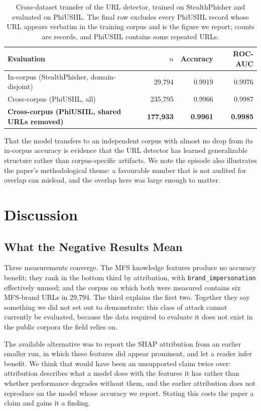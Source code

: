 \documentclass[manuscript,screen,review]{acmart}
\begin{document}
\begin{table}[t]
\centering
\caption{Cross-dataset transfer of the URL detector, trained on StealthPhisher and evaluated on PhiUSIIL. The final row excludes every PhiUSIIL record whose URL appears verbatim in the training corpus and is the figure we report; counts are records, and PhiUSIIL contains some repeated URLs.}
\label{tab:transfer}
\small
\begin{tabular}{lrrr}
\toprule
Evaluation & $n$ & Accuracy & ROC-AUC \\
\midrule
In-corpus (StealthPhisher, domain-disjoint) & 29{,}794 & 0.9919 & 0.9976 \\
Cross-corpus (PhiUSIIL, all) & 235{,}795 & 0.9966 & 0.9987 \\
\textbf{Cross-corpus (PhiUSIIL, shared URLs removed)} & \textbf{177{,}933} & \textbf{0.9961} & \textbf{0.9985} \\
\bottomrule
\end{tabular}
\end{table}

That the model transfers to an independent corpus with almost no drop from its in-corpus accuracy is evidence that the URL detector has learned generalizable structure rather than corpus-specific artifacts. We note the episode also illustrates the paper's methodological theme: a favourable number that is not audited for overlap can mislead, and the overlap here was large enough to matter.

\section{Discussion}
\subsection{What the Negative Results Mean}
Three measurements converge. The MFS knowledge features produce no accuracy benefit; they rank in the bottom third by attribution, with \texttt{brand\_impersonation} effectively unused; and the corpus on which both were measured contains six MFS-brand URLs in 29{,}794. The third explains the first two. Together they say something we did not set out to demonstrate: this class of attack cannot currently be evaluated, because the data required to evaluate it does not exist in the public corpora the field relies on.

The available alternative was to report the SHAP attribution from an earlier smaller run, in which these features did appear prominent, and let a reader infer benefit. We think that would have been an unsupported claim twice over: attribution describes what a model does with the features it has rather than whether performance degrades without them, and the earlier attribution does not reproduce on the model whose accuracy we report. Stating this costs the paper a claim and gains it a finding.
\end{document}
